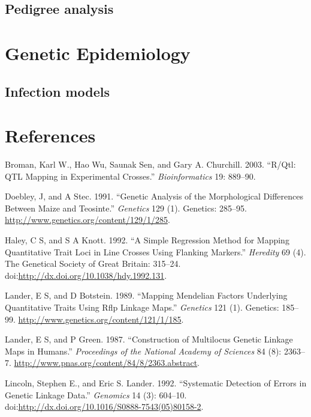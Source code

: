 \documentclass[12pt,]{book}
\theoremstyle{definition}
\theoremstyle{definition}
\theoremstyle{remark}
\begin{document}
\section{Pedigree analysis}\label{pedigree-analysis}

\chapter{Genetic Epidemiology}\label{genetic-epidemiology}

\section{Infection models}\label{infection-models}

\chapter*{References}\label{references}

\hypertarget{refs}{}
\hypertarget{ref-Broman2003}{}
Broman, Karl W., Hao Wu, Saunak Sen, and Gary A. Churchill. 2003.
``R/Qtl: QTL Mapping in Experimental Crosses.'' \emph{Bioinformatics}
19: 889--90.

\hypertarget{ref-Doebley285}{}
Doebley, J, and A Stec. 1991. ``Genetic Analysis of the Morphological
Differences Between Maize and Teosinte.'' \emph{Genetics} 129 (1).
Genetics: 285--95. \url{http://www.genetics.org/content/129/1/285}.

\hypertarget{ref-Haley1992}{}
Haley, C S, and S A Knott. 1992. ``A Simple Regression Method for
Mapping Quantitative Trait Loci in Line Crosses Using Flanking
Markers.'' \emph{Heredity} 69 (4). The Genetical Society of Great
Britain: 315--24.
doi:\href{https://doi.org/http://dx.doi.org/10.1038/hdy.1992.131}{http://dx.doi.org/10.1038/hdy.1992.131}.

\hypertarget{ref-Lander185}{}
Lander, E S, and D Botstein. 1989. ``Mapping Mendelian Factors
Underlying Quantitative Traits Using Rflp Linkage Maps.''
\emph{Genetics} 121 (1). Genetics: 185--99.
\url{http://www.genetics.org/content/121/1/185}.

\hypertarget{ref-Lander01041987}{}
Lander, E S, and P Green. 1987. ``Construction of Multilocus Genetic
Linkage Maps in Humans.'' \emph{Proceedings of the National Academy of
Sciences} 84 (8): 2363--7.
\url{http://www.pnas.org/content/84/8/2363.abstract}.

\hypertarget{ref-Lincoln1992604}{}
Lincoln, Stephen E., and Eric S. Lander. 1992. ``Systematic Detection of
Errors in Genetic Linkage Data.'' \emph{Genomics} 14 (3): 604--10.
doi:\href{https://doi.org/http://dx.doi.org/10.1016/S0888-7543(05)80158-2}{http://dx.doi.org/10.1016/S0888-7543(05)80158-2}.
\end{document}
